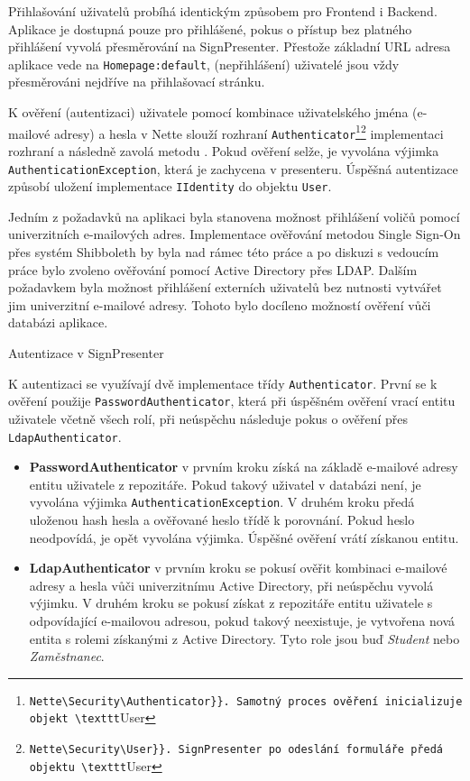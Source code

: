 Přihlašování uživatelů probíhá identickým způsobem pro Frontend i Backend. Aplikace je dostupná pouze pro přihlášené, pokus o přístup bez platného přihlášení vyvolá přesměrování na SignPresenter. Přestože základní URL adresa aplikace vede na \texttt{Homepage:default}, (nepřihlášení) uživatelé jsou vždy přesměrováni nejdříve na přihlašovací stránku.

K ověření (autentizaci) uživatele pomocí kombinace uživatelského jména (e-mailové adresy) a hesla v Nette slouží rozhraní \texttt{Authenticator}\footnote{\Verb{Nette\Security\Authenticator}}. Samotný proces ověření inicializuje objekt \texttt{User}\footnote{\label{user}\Verb{Nette\Security\User}}. SignPresenter po odeslání formuláře předá objektu \texttt{User} implementaci rozhraní a následně zavolá metodu . Pokud ověření selže, je vyvolána výjimka \texttt{AuthenticationException}, která je zachycena v presenteru. Úspěšná autentizace způsobí uložení implementace \texttt{IIdentity} do objektu \texttt{User}.

Jedním z požadavků na aplikaci byla stanovena možnost přihlášení voličů pomocí univerzitních e-mailových adres. Implementace ověřování metodou Single Sign-On přes systém Shibboleth by byla nad rámec této práce a po diskuzi s vedoucím práce bylo zvoleno ověřování pomocí Active Directory přes LDAP. Dalším požadavkem byla možnost přihlášení externích uživatelů bez nutnosti vytvářet jim univerzitní e-mailové adresy. Tohoto bylo docíleno možností ověření vůči databázi aplikace.

\begin{listing}[ht]
\caption{Autentizace v SignPresenter}
\label{php:autentizace}
\end{listing}

K autentizaci se využívají dvě implementace třídy \texttt{Authenticator}. První se k ověření použije \texttt{PasswordAuthenticator}, která při úspěšném ověření vrací entitu uživatele včetně všech rolí, při neúspěchu následuje pokus o ověření přes \texttt{LdapAuthenticator}.

\begin{itemize}
	\item \textbf{PasswordAuthenticator} v prvním kroku získá na základě e-mailové adresy entitu uživatele z repozitáře. Pokud takový uživatel v databázi není, je vyvolána výjimka \texttt{AuthenticationException}. V druhém kroku předá uloženou hash hesla a ověřované heslo třídě  k porovnání. Pokud heslo neodpovídá, je opět vyvolána výjimka. Úspěšné ověření vrátí získanou entitu.
	\item \textbf{LdapAuthenticator} v prvním kroku se pokusí ověřit kombinaci e-mailové adresy a hesla vůči univerzitnímu Active Directory, při neúspěchu vyvolá výjimku. V druhém kroku se pokusí získat z repozitáře entitu uživatele s odpovídající e-mailovou adresou, pokud takový neexistuje, je vytvořena nová entita s rolemi získanými z Active Directory. Tyto role jsou buď \textit{Student} nebo \textit{Zaměstnanec}.
\end{itemize}

